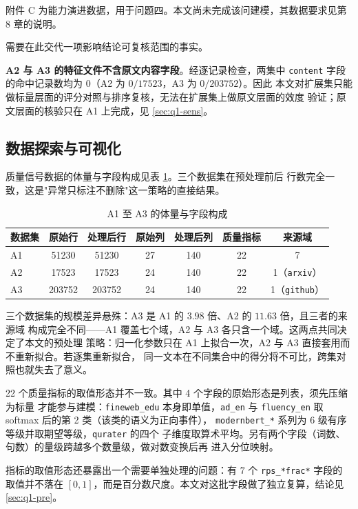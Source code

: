 \documentclass[bwprint]{gmcmthesis}
\numberwithin{equation}{section}
\numberwithin{figure}{section}
\numberwithin{table}{section}
\begin{document}
附件 C 为能力演进数据，用于问题四。本文尚未完成该问建模，其数据要求见第 8 章的说明。

需要在此交代一项影响结论可复核范围的事实。

\textbf{A2 与 A3 的特征文件不含原文内容字段}。经逐记录检查，两集中
\texttt{content} 字段的命中记录数均为 $0$（A2 为 $0/17523$，A3 为 $0/203752$）。因此
本文对扩展集只能做标量层面的评分对照与排序复核，无法在扩展集上做原文层面的效度
验证；原文层面的核验只在 A1 上完成，见 \ref{sec:q1-sens}。

\subsection{数据探索与可视化}

质量信号数据的体量与字段构成见表 \ref{tab:data-overview}。三个数据集在预处理前后
行数完全一致，这是"异常只标注不删除"这一策略的直接结果。

\begin{table}[htp!]
\centering
\renewcommand\arraystretch{1.2}
\caption{A1 至 A3 的体量与字段构成}\label{tab:data-overview}
\begin{tabular*}{\textwidth}{@{\extracolsep{\fill}}lcccccc@{}}
\toprule
数据集 & 原始行 & 处理后行 & 原始列 & 处理后列 & 质量指标 & 来源域 \\
\midrule
A1 & 51230  & 51230  & 27 & 140 & 22 & 7 \\
A2 & 17523  & 17523  & 24 & 140 & 22 & 1（\texttt{arxiv}） \\
A3 & 203752 & 203752 & 24 & 140 & 22 & 1（\texttt{github}） \\
\bottomrule
\end{tabular*}
\end{table}

三个数据集的规模差异悬殊：A3 是 A1 的 $3.98$ 倍、A2 的 $11.63$ 倍，且三者的来源域
构成完全不同——A1 覆盖七个域，A2 与 A3 各只含一个域。这两点共同决定了本文的预处理
策略：归一化参数只在 A1 上拟合一次，A2 与 A3 直接套用而不重新拟合。若逐集重新拟合，
同一文本在不同集合中的得分将不可比，跨集对照也就失去了意义。

22 个质量指标的取值形态并不一致。其中 4 个字段的原始形态是列表，须先压缩为标量
才能参与建模：\texttt{fineweb\_edu} 本身即单值，\texttt{ad\_en} 与
\texttt{fluency\_en} 取 softmax 后的第 2 类（该类的语义为正向事件），
\texttt{modernbert\_*} 系列为 6 级有序等级并取期望等级，\texttt{qurater} 的四个
子维度取算术平均。另有两个字段（词数、句数）的量级跨越多个数量级，做对数变换后再
进入分位映射。

指标的取值形态还暴露出一个需要单独处理的问题：有 7 个 \texttt{rps\_*frac*} 字段的
取值并不落在 $[0,1]$，而是百分数尺度。本文对这批字段做了独立复算，结论见
\ref{sec:q1-pre}。
\end{document}
